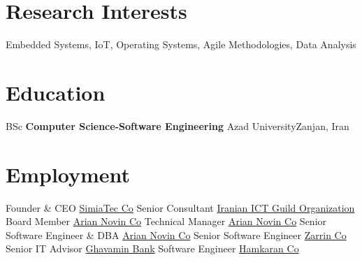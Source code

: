 \documentclass[10pt,a4paper,sans]{moderncv} %
\begin{document}
    \section{Research Interests}
	    \cvitem{}
	    {
	        Embedded Systems,
	        IoT,
	        Operating Systems,
	        Agile Methodologies,
	        Data Analysis

	    }
    \section{Education}
	        {BSc}
	        {\textbf{Computer Science-Software Engineering}}
	        {Azad University}{Zanjan, Iran}{}
    \section{Employment}
	        {Founder \& CEO}
	        {\href{http://intl.irannsr.org/}{SimiaTec Co}}
	        {}{}{}	
	        {Senior Consultant}
	        {\href{http://intl.irannsr.org/}{Iranian ICT Guild Organization}}
	        {}{}{}	
	        {Board Member}
	        {\href{http://arian.co.ir/en-us/home-page}{Arian Novin Co}}
	        {}{}{}	
	        {Technical Manager}
	        {\href{http://arian.co.ir/en-us/home-page}{Arian Novin Co}}
	        {}{}{}	
	        {Senior Software Engineer \& DBA}
	        {\href{http://arian.co.ir/en-us/home-page}{Arian Novin Co}}
	        {}{}{}	
	        {Senior Software Engineer}
	        {\href{http://arian.co.ir/fa-ir/}{Zarrin Co}}
	        {}{}{}	
	        {Senior IT Advisor}
	        {\href{https://www.ghbi.ir/fa/}{Ghavamin Bank}}
	        {}{}{}	
	        {Software Engineer}
	        {\href{https://www.systemgroup.net/}{Hamkaran Co}}
	        {}{}{}	
	

\end{document}

